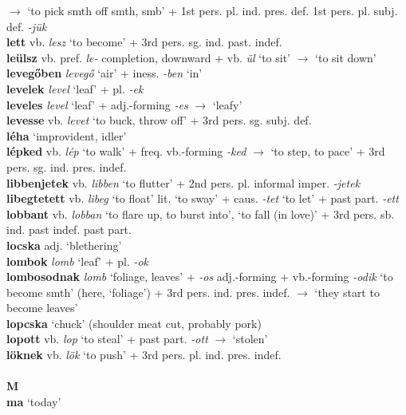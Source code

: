 \documentclass[11pt]{article}
\begin{document}
$\rightarrow$ `to pick smth off smth, smb' + 1st
pers. pl. ind. pres. def. \textbar\textbar{} 1st
pers. pl. subj. def. \emph{-jük} \\
\textbf{lett} vb. \emph{lesz} `to become' + 3rd pers. sg. ind. past. indef. \\
\textbf{leülsz} vb. pref. \emph{le-} completion, downward + vb. \emph{ül}
`to sit' $\rightarrow$ `to sit down' \\
\textbf{levegőben} \emph{levegő} `air' + iness. \emph{-ben} `in' \\
\textbf{levelek} \emph{level} `leaf' + pl. \emph{-ek} \\
\textbf{leveles} \emph{level} `leaf' + adj.\hyp{}forming \emph{-es}
$\rightarrow$ `leafy' \\
\textbf{levesse} vb. \emph{levet} `to buck, throw off' + 3rd
pers. sg. subj. def. \\
\textbf{léha} `improvident, idler' \\
\textbf{lépked} vb. \emph{lép} `to walk' +
freq. vb.\hyp{}forming \emph{-ked} $\rightarrow$ `to step, to pace' +
3rd pers. sg. ind. pres. indef. \\
\textbf{libbenjetek} vb. \emph{libben} `to flutter' + 2nd
pers. pl. informal imper. \emph{-jetek} \\
\textbf{libegtetett} vb. \emph{libeg} `to float' \textbar\textbar{}
lit. `to sway' + caus. \emph{-tet} `to let' + past
part. \emph{-ett} \\
\textbf{lobbant} vb. \emph{lobban} `to flare up, to burst into', `to
fall (in love)' + 3rd pers. sb. ind. past indef. \textbar\textbar{} past
part. \\
\textbf{locska} adj. `blethering' \\
\textbf{lombok} \emph{lomb} `leaf' + pl. \emph{-ok} \\
\textbf{lombosodnak} \emph{lomb} `foliage, leaves' + \emph{-os}
adj.\hyp{}forming + vb.-forming \emph{-odik} `to become smth' (here, `foliage') + 3rd
pers. ind. pres. indef. $\rightarrow$ `they start to become leaves' \\
\textbf{lopcska} `chuck' (shoulder meat cut, probably pork) \\
\textbf{lopott} vb. \emph{lop} `to steal' + past part. \emph{-ott}
$\rightarrow$ `stolen' \\
\textbf{löknek} vb. \emph{lök} `to push' + 3rd pers. pl. ind. pres. indef. \\
\ \\
\noindent \textbf{\large M} \\
\textbf{ma} `today' \\
\end{document}
